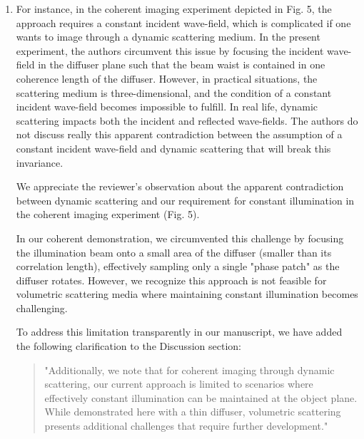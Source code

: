 \documentclass[12pt]{article}
\newenvironment{solved_reviewercomment}
    {\begin{tcolorbox}[width=\linewidth,colback=gray!5,colframe=solved_commentcolor!50,title=Reviewer Comment,left=5pt,right=5pt]}
    {\end{tcolorbox}}
\newenvironment{ourresponse}
    {\begin{tcolorbox}[width=\linewidth,breakable,enhanced,colback=gray!5,colframe=responsecolor!50,title=Response,left=5pt,right=5pt]}
    {\end{tcolorbox}}
\begin{document}
\begin{enumerate}[label=\arabic*.]
    \item \leavevmode\vspace{-\baselineskip}
    \begin{solved_reviewercomment}
        
        For instance, in the coherent imaging experiment depicted in Fig. 5, the approach requires a constant incident wave-field, which is complicated if one wants to image through a dynamic scattering medium. In the present experiment, the authors circumvent this issue by focusing the incident wave-field in the diffuser plane such that the beam waist is contained in one coherence length of the diffuser. However, in practical situations, the scattering medium is three-dimensional, and the condition of a constant incident wave-field becomes impossible to fulfill. In real life, dynamic scattering impacts both the incident and reflected wave-fields. The authors do not discuss really this apparent contradiction between the assumption of a constant incident wave-field and dynamic scattering that will break this invariance.

    \end{solved_reviewercomment}
    \begin{ourresponse}
    We appreciate the reviewer's observation about the apparent contradiction between dynamic scattering and our requirement for constant illumination in the coherent imaging experiment (Fig. 5). 
    
    In our coherent demonstration, we circumvented this challenge by focusing the illumination beam onto a small area of the diffuser (smaller than its correlation length), effectively sampling only a single "phase patch" as the diffuser rotates. However, we recognize this approach is not feasible for volumetric scattering media where maintaining constant illumination becomes challenging.
    
    To address this limitation transparently in our manuscript, we have added the following clarification to the Discussion section:
    
    \begin{quote}
        "Additionally, we note that for coherent imaging through dynamic scattering, our current approach is limited to scenarios where effectively constant illumination can be maintained at the object plane. While demonstrated here with a thin diffuser, volumetric scattering presents additional challenges that require further development."
    \end{quote}
    

\end{ourresponse}
\end{enumerate}
\end{document}
